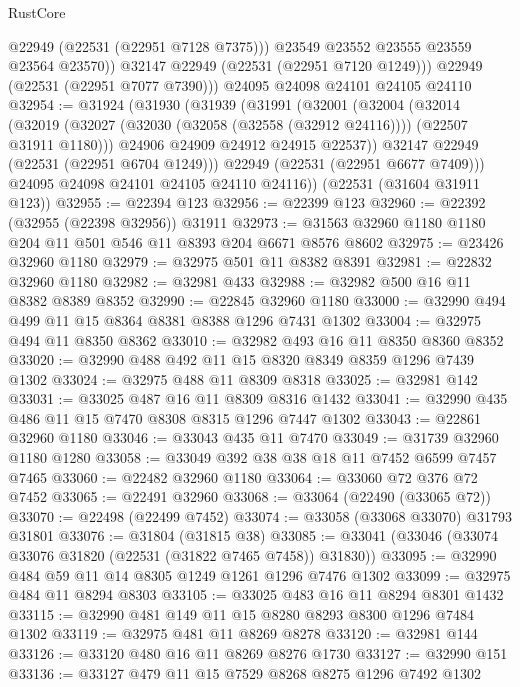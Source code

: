 \begin{lexlean}{RustCore}
\begin{coremodule}
              @22949
              (@22531 (@22951 @7128 @7375)))
            @23549
            @23552
            @23555
            @23559
            @23564
            @23570))
        @32147
        @22949
        (@22531 (@22951 @7120 @1249)))
      @22949
      (@22531 (@22951 @7077 @7390)))
    @24095
    @24098
    @24101
    @24105
    @24110
@32954 := @31924
    (@31930
      (@31939
        (@31991
          (@32001
            (@32004
              (@32014
                (@32019 (@32027 (@32030 (@32058 (@32558 (@32912 @24116)))) (@22507 @31911 @1180)))
                @24906
                @24909
                @24912
                @24915
                @22537))
            @32147
            @22949
            (@22531 (@22951 @6704 @1249)))
          @22949
          (@22531 (@22951 @6677 @7409)))
        @24095
        @24098
        @24101
        @24105
        @24110
        @24116))
    (@22531 (@31604 @31911 @123))
@32955 := @22394 @123
@32956 := @22399 @123
@32960 := @22392 (@32955 (@22398 @32956)) @31911
@32973 := @31563 @32960 @1180 @1180 @204 @11 @501 @546 @11 @8393 @204 @6671 @8576 @8602
@32975 := @23426 @32960 @1180
@32979 := @32975 @501 @11 @8382 @8391
@32981 := @22832 @32960 @1180
@32982 := @32981 @433
@32988 := @32982 @500 @16 @11 @8382 @8389 @8352
@32990 := @22845 @32960 @1180
@33000 := @32990 @494 @499 @11 @15 @8364 @8381 @8388 @1296 @7431 @1302
@33004 := @32975 @494 @11 @8350 @8362
@33010 := @32982 @493 @16 @11 @8350 @8360 @8352
@33020 := @32990 @488 @492 @11 @15 @8320 @8349 @8359 @1296 @7439 @1302
@33024 := @32975 @488 @11 @8309 @8318
@33025 := @32981 @142
@33031 := @33025 @487 @16 @11 @8309 @8316 @1432
@33041 := @32990 @435 @486 @11 @15 @7470 @8308 @8315 @1296 @7447 @1302
@33043 := @22861 @32960 @1180
@33046 := @33043 @435 @11 @7470
@33049 := @31739 @32960 @1180 @1280
@33058 := @33049 @392 @38 @38 @18 @11 @7452 @6599 @7457 @7465
@33060 := @22482 @32960 @1180
@33064 := @33060 @72 @376 @72 @7452
@33065 := @22491 @32960
@33068 := @33064 (@22490 (@33065 @72))
@33070 := @22498 (@22499 @7452)
@33074 := @33058 (@33068 @33070) @31793 @31801
@33076 := @31804 (@31815 @38)
@33085 := @33041 (@33046 (@33074 @33076 @31820 (@22531 (@31822 @7465 @7458)) @31830))
@33095 := @32990 @484 @59 @11 @14 @8305 @1249 @1261 @1296 @7476 @1302
@33099 := @32975 @484 @11 @8294 @8303
@33105 := @33025 @483 @16 @11 @8294 @8301 @1432
@33115 := @32990 @481 @149 @11 @15 @8280 @8293 @8300 @1296 @7484 @1302
@33119 := @32975 @481 @11 @8269 @8278
@33120 := @32981 @144
@33126 := @33120 @480 @16 @11 @8269 @8276 @1730
@33127 := @32990 @151
@33136 := @33127 @479 @11 @15 @7529 @8268 @8275 @1296 @7492 @1302

\end{coremodule}
\end{lexlean}
